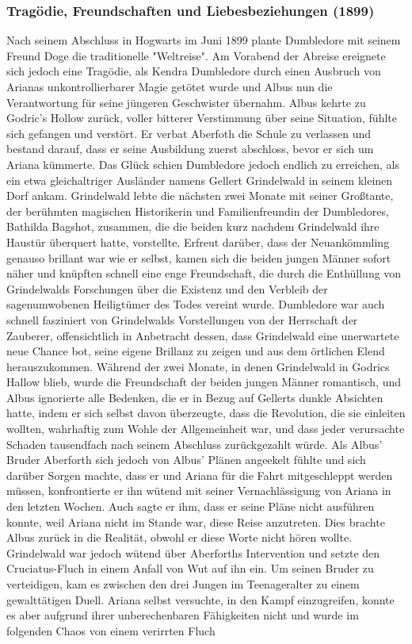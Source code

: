 \documentclass[a4paper, 10pt]{article}
\begin{document}
\subsubsection*{\large Tragödie, Freundschaften und Liebesbeziehungen (1899)}
Nach seinem Abschluss in Hogwarts im Juni 1899 plante Dumbledore mit seinem Freund Doge die traditionelle "Weltreise". Am Vorabend der Abreise ereignete sich jedoch eine Tragödie, als Kendra Dumbledore durch einen Ausbruch von Arianas unkontrollierbarer Magie getötet wurde und Albus nun die Verantwortung für seine jüngeren Geschwister übernahm. Albus kehrte zu Godric's Hollow zurück, voller bitterer Verstimmung über seine Situation, fühlte sich gefangen und verstört. Er verbat Aberfoth die Schule zu verlassen und bestand darauf, dass er seine Ausbildung zuerst abschloss, bevor er sich um Ariana kümmerte. Das Glück schien Dumbledore jedoch endlich zu erreichen, als ein etwa gleichaltriger Ausländer namens Gellert Grindelwald in seinem kleinen Dorf ankam. Grindelwald lebte die nächsten zwei Monate mit seiner Großtante, der berühmten magischen Historikerin und Familienfreundin der Dumbledores, Bathilda Bagshot, zusammen, die die beiden kurz nachdem Grindelwald ihre Haustür überquert hatte, vorstellte. Erfreut darüber, dass der Neuankömmling genauso brillant war wie er selbst, kamen sich die beiden jungen Männer sofort näher und knüpften schnell eine enge Freundschaft, die durch die Enthüllung von Grindelwalds Forschungen über die Existenz und den Verbleib der sagenumwobenen Heiligtümer des Todes vereint wurde. Dumbledore war auch schnell fasziniert von Grindelwalds Vorstellungen von der Herrschaft der Zauberer, offensichtlich in Anbetracht dessen, dass Grindelwald eine unerwartete neue Chance bot, seine eigene Brillanz zu zeigen und aus dem örtlichen Elend herauszukommen. Während der zwei Monate, in denen Grindelwald in Godrics Hallow blieb, wurde die Freundschaft der beiden jungen Männer romantisch, und Albus ignorierte alle Bedenken, die er in Bezug auf Gellerts dunkle Absichten hatte, indem er sich selbst davon überzeugte, dass die Revolution, die sie einleiten wollten, wahrhaftig zum Wohle der Allgemeinheit war, und dass jeder verursachte Schaden tausendfach nach seinem Abschluss zurückgezahlt würde.
\vspace{10pt}
\newline
Als Albus' Bruder Aberforth sich jedoch von Albus' Plänen angeekelt fühlte und sich darüber Sorgen machte, dass er und Ariana für die Fahrt mitgeschleppt werden müssen, konfrontierte er ihn wütend mit seiner Vernachlässigung von Ariana in den letzten Wochen. Auch sagte er ihm, dass er seine Pläne nicht ausführen konnte, weil Ariana nicht im Stande war, diese Reise anzutreten. Dies brachte Albus zurück in die Realität, obwohl er diese Worte nicht hören wollte. Grindelwald war jedoch wütend über Aberforths Intervention und setzte den Cruciatus-Fluch in einem Anfall von Wut auf ihn ein. Um seinen Bruder zu verteidigen, kam es zwischen den drei Jungen im Teenageralter zu einem gewalttätigen Duell. Ariana selbst versuchte, in den Kampf einzugreifen, konnte es aber aufgrund ihrer unberechenbaren Fähigkeiten nicht und wurde im folgenden Chaos von einem verirrten Fluch
\end{document}

